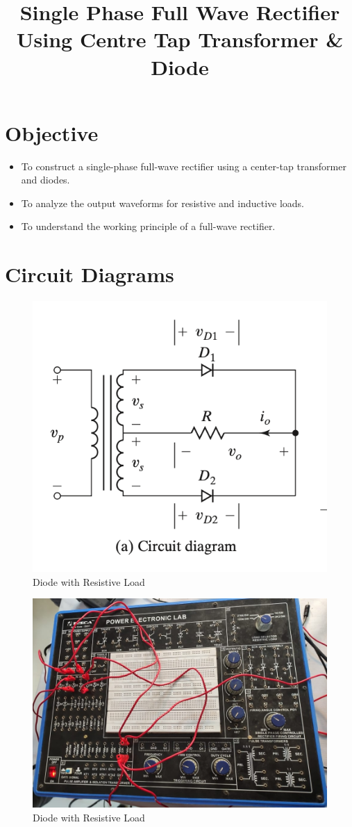 \documentclass[12pt]{article}
\title{Single Phase Full Wave Rectifier Using Centre Tap Transformer \& Diode}
\author{}
\date{}
\begin{document}
\pagebreak
{}
\maketitle

\section*{Objective}
\begin{itemize}
    \item To construct a single-phase full-wave rectifier using a center-tap transformer and diodes.
    \item To analyze the output waveforms for resistive and inductive loads.
    \item To understand the working principle of a full-wave rectifier.
\end{itemize}

\section*{Circuit Diagrams}
\begin{figure}[H]
    \centering
    \includegraphics[width=.5\textwidth]{centre_ckt.png}
    \caption{Diode with Resistive Load \cite{rashid2013power}}
    \label{fig:dc_r_load}
\end{figure}

\begin{figure}[H]
    \centering
    \includegraphics[width=.5\textwidth]{centre_tap.jpeg}
    \caption{Diode with Resistive Load \cite{rashid2013power}}
    \label{fig:dc_r_losad}
\end{figure}
\end{document}
